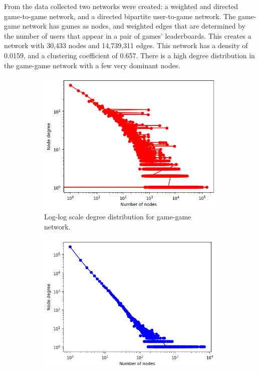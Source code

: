 From the data collected two networks were created: a weighted and directed game-to-game network, and a directed bipartite user-to-game network. The game-game network has games as nodes, and weighted edges that are determined by the number of users that appear in a pair of games' leaderboards. This creates a network with 30,433 nodes and 14,739,311 edges. This network has a density of 0.0159, and a clustering coefficient of 0.657. There is a high degree distribution in the game-game network with a few very dominant nodes.

\begin{figure}[h]
  \centering
  \begin{subfigure}{0.45\linewidth}
    \centering
    \includegraphics[width=\linewidth]{images/out-degree-distribution-loglog.png}
    \caption{Log-log scale degree distribution for game-game network.}
    \label{fig:figure1}
  \end{subfigure}
  \hspace{0.05\linewidth}
  \begin{subfigure}{0.45\linewidth}
    \centering
    \includegraphics[width=\linewidth]{images/user-game-degree-distribution-loglog.png}

\end{subfigure}
\end{figure}
